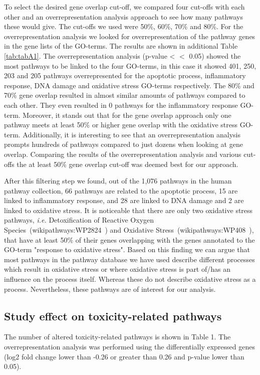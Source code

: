 \documentclass[ijms,article,submit,moreauthors,pdftex]{Definitions/mdpi}
\begin{document}
To select the desired gene overlap cut-off, we compared four cut-offs with each other and an overrepresentation analysis approach to see how many pathways these would give. The cut-offs we used were 50\%, 60\%, 70\% and 80\%. For the overrepresentation analysis we looked for overrepresentation of the pathway genes in the gene lists of the GO-terms. The results are shown in additional Table \ref{tab:tabA1}. The overrepresentation analysis (p-value < $<$ 0.05) showed the most pathways to be linked to the four GO-terms, in this case it showed 401, 250, 203 and 205 pathways overrepresented for the apoptotic process, inflammatory response, DNA damage and oxidative stress GO-terms respectively. The 80\% and 70\% gene overlap resulted in almost similar amounts of pathways compared to each other. They even resulted in 0 pathways for the inflammatory response GO-term. Moreover, it stands out that for the gene overlap approach only one pathway meets at least 50\% or higher gene overlap with the oxidative stress GO-term. Additionally, it is interesting to see that an overrepresentation analysis prompts hundreds of pathways compared to just dozens when looking at gene overlap. Comparing the results of the overrepresentation analysis and various cut-offs the at least 50\% gene overlap cut-off was deemed best for our approach. 

After this filtering step we found, out of the 1,076 pathways in the human pathway collection, 66 pathways are related to the apoptotic process, 15 are linked to inflammatory response, and 28 are linked to DNA damage and 2 are linked to oxidative stress.
It is noticeable that there are only two oxidative stress pathways, \textit{i.e.} Detoxification of Reactive Oxygen Species~(wikipathways:WP2824~\cite{WP2824}) and Oxidative Stress~(wikipathways:WP408~\cite{WP408}), that have at least 50$\%$ of their genes overlapping with the genes annotated to the GO-term "response to oxidative stress". Based on this finding we can argue that most pathways in the pathway database we have used describe different processes which result in oxidative stress or where oxidative stress is part of/has an influence on the process itself. Whereas these do not describe oxidative stress as a process.  Nevertheless, these pathways are of interest for our analysis. 

\subsection*{Study effect on toxicity-related pathways}
The number of altered toxicity-related pathways is shown in Table 1. The overrepresentation analysis was performed using the differentially expressed genes (log2 fold change lower than -0.26 or greater than 0.26 and p-value lower than 0.05). 
\end{document}
